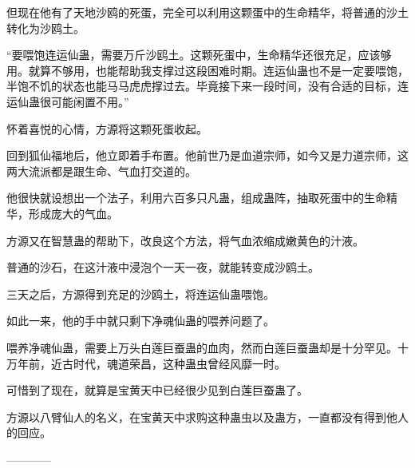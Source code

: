 \begin{this_body}
但现在他有了天地沙鸥的死蛋，完全可以利用这颗蛋中的生命精华，将普通的沙土转化为沙鸥土。

“要喂饱连运仙蛊，需要万斤沙鸥土。这颗死蛋中，生命精华还很充足，应该够用。就算不够用，也能帮助我支撑过这段困难时期。连运仙蛊也不是一定要喂饱，半饱不饥的状态也能马马虎虎撑过去。毕竟接下来一段时间，没有合适的目标，连运仙蛊很可能闲置不用。”

怀着喜悦的心情，方源将这颗死蛋收起。

回到狐仙福地后，他立即着手布置。他前世乃是血道宗师，如今又是力道宗师，这两大流派都是跟生命、气血打交道的。

他很快就设想出一个法子，利用六百多只凡蛊，组成蛊阵，抽取死蛋中的生命精华，形成庞大的气血。

方源又在智慧蛊的帮助下，改良这个方法，将气血浓缩成嫩黄色的汁液。

普通的沙石，在这汁液中浸泡个一天一夜，就能转变成沙鸥土。

三天之后，方源得到充足的沙鸥土，将连运仙蛊喂饱。

如此一来，他的手中就只剩下净魂仙蛊的喂养问题了。

喂养净魂仙蛊，需要上万头白莲巨蚕蛊的血肉，然而白莲巨蚕蛊却是十分罕见。十万年前，近古时代，魂道荣昌，这种蛊虫曾经风靡一时。

可惜到了现在，就算是宝黄天中已经很少见到白莲巨蚕蛊了。

方源以八臂仙人的名义，在宝黄天中求购这种蛊虫以及蛊方，一直都没有得到他人的回应。

------------

\end{this_body}


